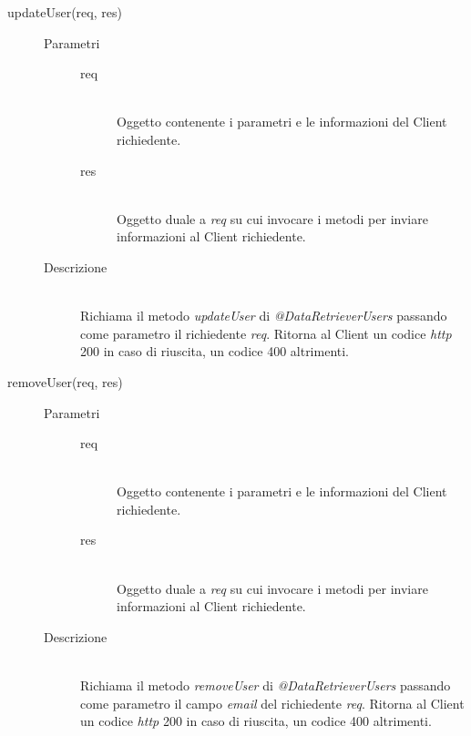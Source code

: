 \begin{description}
\begin{description}
    \item[updateUser(req, res)] \hfill
    \begin{description}
	\item[Parametri] \hfill
	  \begin{description}
	    \item[req] \hfill \\
	    Oggetto contenente i parametri e le informazioni del Client richiedente.
	    \item[res] \hfill \\
	    Oggetto duale a \textit{req} su cui invocare i metodi per inviare informazioni al Client richiedente.
	  \end{description}
	\item[Descrizione] \hfill \\
	Richiama il metodo \textit{updateUser} di \textit{@DataRetrieverUsers} passando come parametro il richiedente \textit{req}. Ritorna al Client un codice \textit{http} 200 in caso di riuscita, un codice 400 altrimenti.
      \end{description}
      
    \item[removeUser(req, res)] \hfill
    \begin{description}
	\item[Parametri] \hfill
	  \begin{description}
	    \item[req] \hfill \\
	    Oggetto contenente i parametri e le informazioni del Client richiedente.
	    \item[res] \hfill \\
	    Oggetto duale a \textit{req} su cui invocare i metodi per inviare informazioni al Client richiedente.
	  \end{description}
	\item[Descrizione] \hfill \\
	Richiama il metodo \textit{removeUser} di \textit{@DataRetrieverUsers} passando come parametro il campo \textit{email} del richiedente \textit{req}. Ritorna al Client un codice \textit{http} 200 in caso di riuscita, un codice 400 altrimenti.
      \end{description}
      
 \end{description}
 
\end{description}


